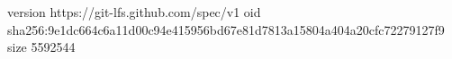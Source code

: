 version https://git-lfs.github.com/spec/v1
oid sha256:9e1dc664c6a11d00c94e415956bd67e81d7813a15804a404a20cfc72279127f9
size 5592544
